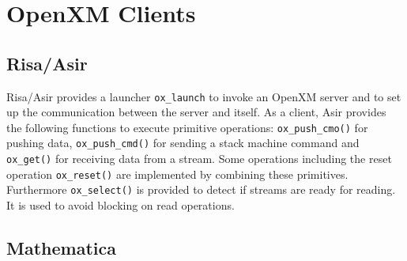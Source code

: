 
\section{OpenXM Clients}    

\subsection{Risa/Asir}

Risa/Asir provides a launcher {\tt ox\_launch}
to invoke an OpenXM server and to set up the
communication between the server and itself.
As a client, Asir provides the following functions
to execute primitive operations:
{\tt ox\_push\_cmo()} for pushing data,
{\tt ox\_push\_cmd()} for sending a stack machine command
and {\tt ox\_get()} for receiving data from a stream.
Some operations including the reset operation {\tt ox\_reset()} 
are implemented by combining these primitives.
%
%
%
%
%
%
%
Furthermore {\tt ox\_select()} is provided to detect if streams are ready for
reading.  It is used to avoid blocking on read operations.

\subsection{Mathematica}

